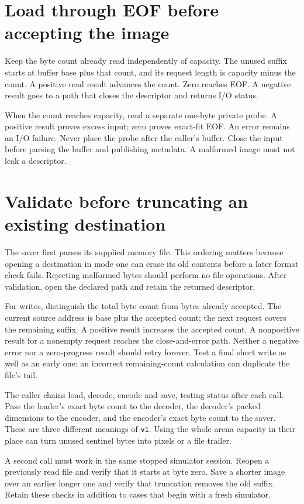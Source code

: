 \section{Load through EOF before accepting the image}
Keep the byte count already read independently of capacity. The unused suffix starts
at buffer base plus that count, and its request length is capacity minus the count.
A positive read result advances the count. Zero reaches EOF. A negative result goes to
a path that closes the descriptor and returns I/O status.

When the count reaches capacity, read a separate one-byte private probe. A positive
result proves excess input; zero proves exact-fit EOF. An error remains an I/O failure.
Never place the probe after the caller's buffer. Close the input before parsing the
buffer and publishing metadata. A malformed image must not leak a descriptor.

\section{Validate before truncating an existing destination}
The saver first parses its supplied memory file. This ordering matters because opening
a destination in mode one can erase its old contents before a later format check fails.
Rejecting malformed bytes should perform no file operations. After validation, open the
declared path and retain the returned descriptor.

For writes, distinguish the total byte count from bytes already accepted. The current
source address is base plus the accepted count; the next request covers the remaining
suffix. A positive result increases the accepted count. A nonpositive result for a
nonempty request reaches the close-and-error path. Neither a negative error nor a
zero-progress result should retry forever. Test a final short write as well as an
early one: an incorrect remaining-count calculation can duplicate the file's tail.

The caller chains load, decode, encode and save, testing status after each call. Pass
the loader's exact byte count to the decoder, the decoder's packed dimensions to the
encoder, and the encoder's exact byte count to the saver. These are three different
meanings of \texttt{v1}. Using the whole arena capacity in their place can turn unused
sentinel bytes into pixels or a file trailer.

A second call must work in the same stopped simulator session. Reopen a previously read
file and verify that it starts at byte zero. Save a shorter image over an earlier longer
one and verify that truncation removes the old suffix. Retain these checks in addition
to cases that begin with a fresh simulator.
